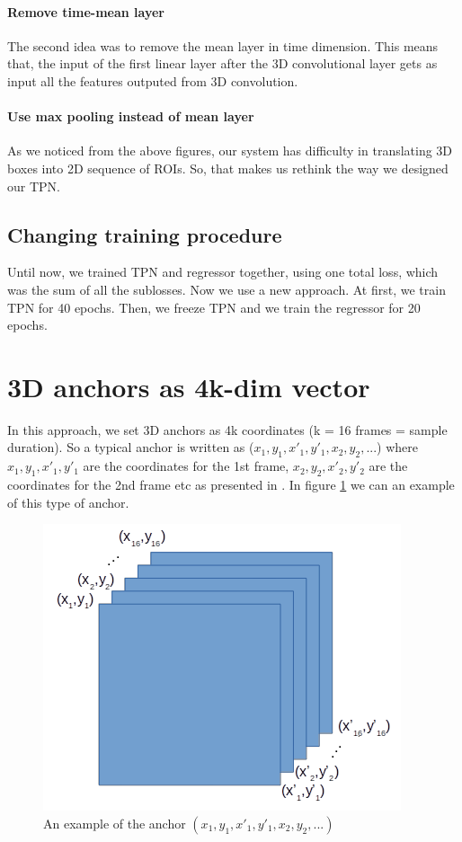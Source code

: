 \documentclass{report}
\begin{document}
\paragraph{Remove time-mean layer}
The second idea was to remove the mean layer in time dimension. This means that, the input of the first linear layer after the 3D convolutional layer gets as
input all the features outputed from 3D convolution. 
\paragraph{Use max pooling instead of mean layer}


\par
As we noticed from the above figures, our system has difficulty in translating 3D boxes into 2D sequence of ROIs. So, that makes us rethink the way we designed
our TPN.
\subsection{Changing training procedure}
Until now, we trained TPN and regressor together, using one total loss, which was the sum of all the sublosses. Now we use a new approach.
At first, we  train TPN for 40 epochs. Then, we freeze TPN and we train the regressor for 20 epochs.


\section{ 3D anchors as 4k-dim vector}
In this approach, we set 3D anchors as 4k coordinates (k = 16 frames = sample duration). So a typical anchor is written as ($x_1, y_1, x'_1, y'_1, x_2, y_2, ...$)
where $x_1, y_1, x'_1, y'_1 $ are the coordinates for the 1st frame, $x_2, y_2, x'_2, y'_2$ are the coordinates for the 2nd frame etc as presented in \cite{}.
In figure \ref{fig:anchor_4k} we can an example of this type of anchor.

\begin{figure}[h]
  \centering
  \includegraphics[scale=0.5]{anchor_4k}
  \caption{An example of the anchor $(x_1,y_1,x'_1,y'_1,x_2,y_2, ...)$}
  \label{fig:anchor_4k}
\end{figure}
\end{document}
